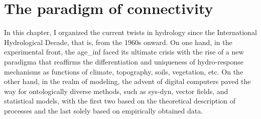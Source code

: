 \documentclass[./main_en.tex]{subfiles}
\begin{document}
\section{The paradigm of connectivity}

\par In this chapter, I organized the current twists in \gls{hydrology} since the International Hydrological Decade, that is, from the 1960s onward. On one hand, in the experimental front, the \gls{age_inf} faced its ultimate crisis with the rise of a new \gls{paradigma} that reaffirms the differentiation and uniqueness of \gls{hydro-response} mechanisms as functions of climate, topography, soils, vegetation, etc. On the other hand, in the realm of modeling, the advent of digital computers paved the way for ontologically diverse methods, such as \gls{sys-dyn}, vector fields, and statistical models, with the first two based on the theoretical description of processes and the last solely based on empirically obtained data.
\end{document}
